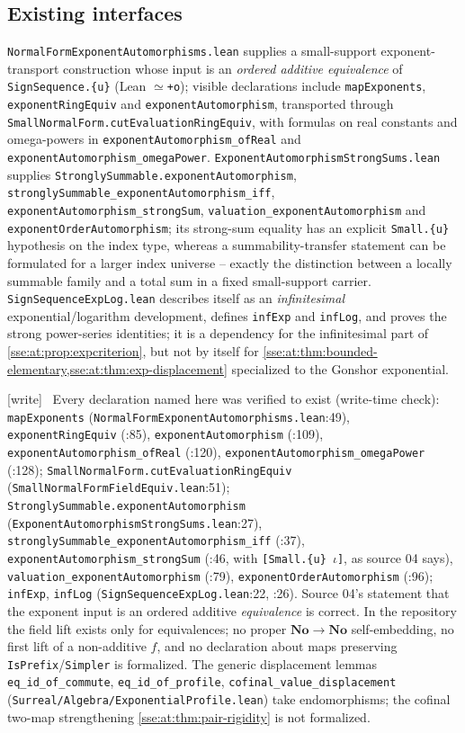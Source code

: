\documentclass[11pt,a4paper]{article}
\numberwithin{equation}{section}
\theoremstyle{plain}
\theoremstyle{definition}
\theoremstyle{remark}
\newcommand{\No}{\mathbf{No}}
\newcommand{\code}[1]{\texttt{\small #1}}
\newcommand{\fn}[1]{\nolinkurl{#1}}%
\newcommand{\wtag}{\textup{\textsf{[write]}}}%
\newenvironment{wnote}{\par\smallskip\noindent\wtag\ }{\par\smallskip}
\newcommand{\declat}[1]{\nolinkurl{#1}}%
\begin{document}
\subsection{Existing interfaces}
\fn{NormalFormExponentAutomorphisms.lean} supplies a small-support
exponent-transport construction whose input is an \emph{ordered additive
equivalence} of \code{SignSequence.\{u\}} (Lean \code{$\simeq$+o}); visible
declarations include \declat{mapExponents}, \declat{exponentRingEquiv} and
\declat{exponentAutomorphism}, transported through
\declat{SmallNormalForm.cutEvaluationRingEquiv}, with formulas on real constants
and omega-powers in \declat{exponentAutomorphism_ofReal} and
\declat{exponentAutomorphism_omegaPower}. \fn{ExponentAutomorphismStrongSums.lean}
supplies \declat{StronglySummable.exponentAutomorphism},
\declat{stronglySummable_exponentAutomorphism_iff},
\declat{exponentAutomorphism_strongSum}, \declat{valuation_exponentAutomorphism}
and \declat{exponentOrderAutomorphism}; its strong-sum equality has an explicit
\code{Small.\{u\}} hypothesis on the index type, whereas a summability-transfer
statement can be formulated for a larger index universe -- exactly the
distinction between a locally summable family and a total sum in a fixed
small-support carrier. \fn{SignSequenceExpLog.lean} describes itself as an
\emph{infinitesimal} exponential/logarithm development, defines \declat{infExp}
and \declat{infLog}, and proves the strong power-series identities; it is a
dependency for the infinitesimal part of \cref{sse:at:prop:expcriterion}, but
not by itself for \cref{sse:at:thm:bounded-elementary,sse:at:thm:exp-displacement}
specialized to the Gonshor exponential.
\begin{wnote}
Every declaration named here was verified to exist (write-time check):
\declat{mapExponents} (\fn{NormalFormExponentAutomorphisms.lean}:49),
\declat{exponentRingEquiv} (:85), \declat{exponentAutomorphism} (:109),
\declat{exponentAutomorphism_ofReal} (:120),
\declat{exponentAutomorphism_omegaPower} (:128);
\declat{SmallNormalForm.cutEvaluationRingEquiv} (\fn{SmallNormalFormFieldEquiv.lean}:51);
\declat{StronglySummable.exponentAutomorphism}
(\fn{ExponentAutomorphismStrongSums.lean}:27),
\declat{stronglySummable_exponentAutomorphism_iff} (:37),
\declat{exponentAutomorphism_strongSum} (:46, with \code{[Small.\{u\} $\iota$]}, as
source 04 says), \declat{valuation_exponentAutomorphism} (:79),
\declat{exponentOrderAutomorphism} (:96); \declat{infExp}, \declat{infLog}
(\fn{SignSequenceExpLog.lean}:22, :26). Source 04's statement that the
exponent input is an ordered additive \emph{equivalence} is correct. In the
repository the field lift exists only for equivalences; no proper
$\No\to\No$ self-embedding, no first lift of a non-additive $f$, and no
declaration about maps preserving \code{IsPrefix}/\code{Simpler} is
formalized. The generic displacement lemmas \declat{eq_id_of_commute},
\declat{eq_id_of_profile}, \declat{cofinal_value_displacement}
(\fn{Surreal/Algebra/ExponentialProfile.lean}) take endomorphisms; the cofinal
two-map strengthening \cref{sse:at:thm:pair-rigidity} is not formalized.
\end{wnote}
\end{document}

